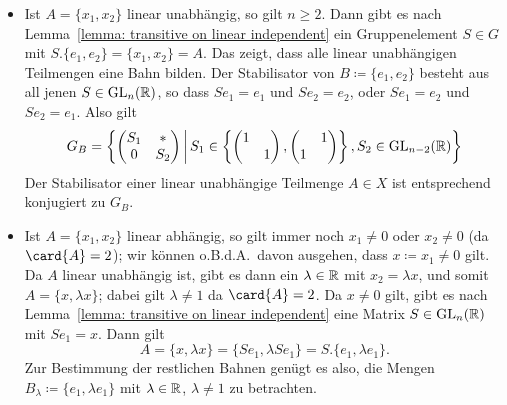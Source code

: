 \begin{itemize}
  \item
    Ist $A = \{x_1, x_2\}$ linear unabhängig, so gilt $n \geq 2$.
    Dann gibt es nach Lemma~\ref{lemma: transitive on linear independent} ein Gruppenelement $S \in G$ mit $S.\{e_1, e_2\} = \{x_1, x_2\} = A$.
    Das zeigt, dass alle linear unabhängigen Teilmengen eine Bahn bilden.
    Der Stabilisator von $B \coloneqq \{e_1, e_2\}$ besteht aus all jenen $S \in \operatorname{GL}_{n}(\mathbb{R})$, so dass $Se_1 = e_1$ und $Se_2 = e_2$, oder $Se_1 = e_2$ und $Se_2 = e_1$.
    Also gilt
    \[
        G_B
      = \left\{
          \begin{pmatrix}
            S_1 & *   \\
            0   & S_2
          \end{pmatrix}
          \suchthat*
              S_1
          \in \left\{
                \begin{pmatrix}
                  1 &   \\
                    & 1
                \end{pmatrix},
                \begin{pmatrix}
                    & 1 \\
                  1 &
                \end{pmatrix}
              \right\},
              S_2
          \in \GL{n-2}{\Real}
        \right\}
    \]
    Der Stabilisator einer linear unabhängige Teilmenge $A \in X$ ist entsprechend konjugiert zu $G_B$.
  \item
    Ist $A = \{x_1, x_2\}$ linear abhängig, so gilt immer noch $x_1 \neq 0$ oder $x_2 \neq 0$ (da $\card{A} = 2$);
    wir können o.B.d.A.\ davon ausgehen, dass $x \coloneqq x_1 \neq 0$ gilt.
    Da $A$ linear unabhängig ist, gibt es dann ein $\lambda \in \mathbb{R}$ mit $x_2 = \lambda x$, und somit $A = \{x, \lambda x\}$;
    dabei gilt  $\lambda \neq 1$ da $\card{A} = 2$.
    Da $x \neq 0$ gilt, gibt es nach Lemma~\ref{lemma: transitive on linear independent} eine Matrix $S \in \operatorname{GL}_{n}(\mathbb{R})$ mit $Se_1 = x$.
    Dann gilt
    \[
        A
      = \{ x, \lambda x \}
      = \{ Se_1, \lambda Se_1 \}
      = S.\{ e_1, \lambda e_1 \}.
    \]
    Zur Bestimmung der restlichen Bahnen genügt es also, die Mengen $B_\lambda \coloneqq \{e_1, \lambda e_1\}$ mit $\lambda \in \mathbb{R}$, $\lambda \neq 1$ zu betrachten.
    

\end{itemize}
